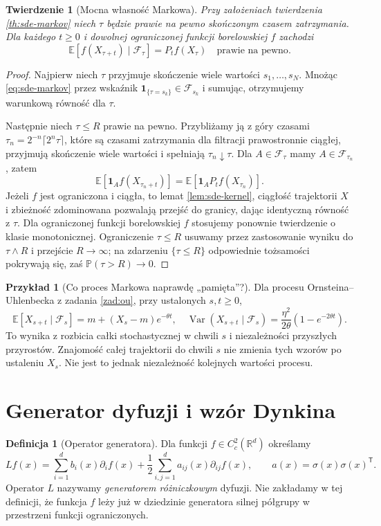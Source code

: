 \documentclass[11pt,a4paper,oneside]{report}
\numberwithin{equation}{chapter}
\theoremstyle{plain}
\newtheorem{twierdzenie}{Twierdzenie}[chapter]
\theoremstyle{definition}
\newtheorem{definicja}{Definicja}[chapter]
\newtheorem{przyklad}{Przykład}[chapter]
\theoremstyle{remark}
\newcommand{\R}{\mathbb{R}}
\newcommand{\Prob}{\mathbb{P}}
\newcommand{\E}{\mathbb{E}}
\newcommand{\Var}{\operatorname{Var}}
\newcommand{\calF}{\mathcal{F}}
\newcommand{\ind}[1]{\mathbf{1}_{#1}}
\begin{document}
\begin{twierdzenie}[Mocna własność Markowa]
\label{th:sde-strongmarkov}
Przy założeniach twierdzenia \ref{th:sde-markov}
niech $\tau$ będzie prawie na pewno skończonym
czasem zatrzymania. Dla każdego $t\ge0$ i dowolnej
ograniczonej funkcji borelowskiej $f$ zachodzi
\[
\E[f(X_{\tau+t})\mid\calF_\tau]=P_tf(X_\tau)
\quad\text{prawie na pewno}.
\tag{6.4}\label{eq:sde-strongmarkov}
\]
\end{twierdzenie}
\begin{proof}
Najpierw niech $\tau$ przyjmuje skończenie wiele
wartości $s_1,\ldots,s_N$. Mnożąc
\eqref{eq:sde-markov} przez wskaźnik
$\ind{\{\tau=s_k\}}\in\calF_{s_k}$ i sumując,
otrzymujemy warunkową równość dla $\tau$.

Następnie niech $\tau\le R$ prawie na pewno.
Przybliżamy ją z góry czasami
$\tau_n=2^{-n}\lceil2^n\tau\rceil$,
które są czasami zatrzymania dla filtracji
prawostronnie ciągłej, przyjmują skończenie wiele
wartości i spełniają $\tau_n\downarrow\tau$.
Dla $A\in\calF_\tau$ mamy $A\in\calF_{\tau_n}$,
zatem
\[
\E[\ind A f(X_{\tau_n+t})]
=\E[\ind A P_tf(X_{\tau_n})].
\]
Jeżeli $f$ jest ograniczona i ciągła, to lemat
\ref{lem:sde-kernel}, ciągłość trajektorii $X$
i zbieżność zdominowana pozwalają przejść do granicy,
dając identyczną równość z $\tau$.
Dla ograniczonej funkcji borelowskiej $f$ stosujemy
ponownie twierdzenie o klasie monotonicznej.
Ograniczenie $\tau\le R$ usuwamy przez zastosowanie
wyniku do $\tau\wedge R$ i przejście $R\to\infty$;
na zdarzeniu $\{\tau\le R\}$ odpowiednie tożsamości
pokrywają się, zaś $\Prob(\tau>R)\to0$.
\end{proof}

\begin{przyklad}[Co proces Markowa naprawdę „pamięta”?]
Dla procesu Ornsteina--Uhlenbecka z zadania
\ref{zad:ou}, przy ustalonych $s,t\ge0$,
\[
\E[X_{s+t}\mid\calF_s]
=m+(X_s-m)e^{-\theta t},
\quad
\Var(X_{s+t}\mid\calF_s)
=\frac{\eta^2}{2\theta}(1-e^{-2\theta t}).
\]
To wynika z rozbicia całki stochastycznej w chwili
$s$ i niezależności przyszłych przyrostów. Znajomość
całej trajektorii do chwili $s$ nie zmienia tych
wzorów po ustaleniu $X_s$. Nie jest to jednak
niezależność kolejnych wartości procesu.
\end{przyklad}

\section{Generator dyfuzji i wzór Dynkina}
\begin{definicja}[Operator generatora]
Dla funkcji $f\in C_c^2(\R^d)$ określamy
\[
Lf(x)=\sum_{i=1}^d b_i(x)\partial_i f(x)
+\frac12\sum_{i,j=1}^d a_{ij}(x)\partial_{ij}f(x),
\qquad a(x)=\sigma(x)\sigma(x)^{\mathsf T}.
\tag{6.5}\label{eq:sde-generator}
\]
Operator $L$ nazywamy \emph{generatorem różniczkowym}
dyfuzji. Nie zakładamy w tej definicji, że funkcja
$f$ leży już w dziedzinie generatora silnej półgrupy
w przestrzeni funkcji ograniczonych.
\end{definicja}
\end{document}
